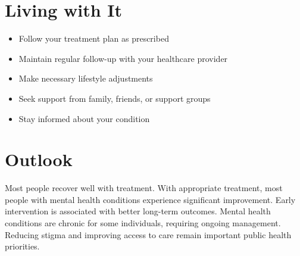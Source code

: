 \section{Living with It}
\begin{itemize}[noitemsep]
  \item Follow your treatment plan as prescribed
  \item Maintain regular follow-up with your healthcare provider
  \item Make necessary lifestyle adjustments
  \item Seek support from family, friends, or support groups
  \item Stay informed about your condition
\end{itemize}
\section{Outlook}
Most people recover well with treatment. With appropriate treatment, most people with mental health conditions experience significant improvement. Early intervention is associated with better long-term outcomes. Mental health conditions are chronic for some individuals, requiring ongoing management. Reducing stigma and improving access to care remain important public health priorities.
